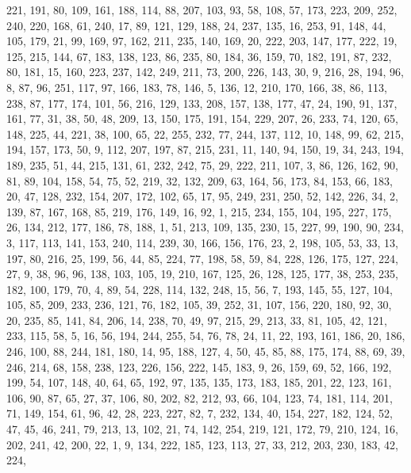 \begin{DoxyCode}
       221, 191, 80, 109, 161, 188, 114, 88, 207, 103, 93, 58, 108, 57, 173, 223, 209, 252, 240, 220, 168, 61, 240,
       17, 89, 121, 129, 188, 24, 237, 135, 16, 253, 91, 148, 44, 105, 179, 21, 99, 169, 97, 162, 211, 235, 140,
       169, 20, 222, 203, 147, 177, 222, 19, 125, 215, 144, 67, 183, 138, 123, 86, 235, 80, 184, 36, 159, 70, 182,
       191, 87, 232, 80, 181, 15, 160, 223, 237, 142, 249, 211, 73, 200, 226, 143, 30, 9, 216, 28, 194, 96, 8, 87,
       96, 251, 117, 97, 166, 183, 78, 146, 5, 136, 12, 210, 170, 166, 38, 86, 113, 238, 87, 177, 174, 101, 56, 216,
       129, 133, 208, 157, 138, 177, 47, 24, 190, 91, 137, 161, 77, 31, 38, 50, 48, 209, 13, 150, 175, 191, 154,
       229, 207, 26, 233, 74, 120, 65, 148, 225, 44, 221, 38, 100, 65, 22, 255, 232, 77, 244, 137, 112, 10, 148, 99,
       62, 215, 194, 157, 173, 50, 9, 112, 207, 197, 87, 215, 231, 11, 140, 94, 150, 19, 34, 243, 194, 189, 235,
       51, 44, 215, 131, 61, 232, 242, 75, 29, 222, 211, 107, 3, 86, 126, 162, 90, 81, 89, 104, 158, 54, 75, 52, 219,
       32, 132, 209, 63, 164, 56, 173, 84, 153, 66, 183, 20, 47, 128, 232, 154, 207, 172, 102, 65, 17, 95, 249,
       231, 250, 52, 142, 226, 34, 2, 139, 87, 167, 168, 85, 219, 176, 149, 16, 92, 1, 215, 234, 155, 104, 195, 227,
       175, 26, 134, 212, 177, 186, 78, 188, 1, 51, 213, 109, 135, 230, 15, 227, 99, 190, 90, 234, 3, 117, 113,
       141, 153, 240, 114, 239, 30, 166, 156, 176, 23, 2, 198, 105, 53, 33, 13, 197, 80, 216, 25, 199, 56, 44, 85,
       224, 77, 198, 58, 59, 84, 228, 126, 175, 127, 224, 27, 9, 38, 96, 96, 138, 103, 105, 19, 210, 167, 125, 26,
       128, 125, 177, 38, 253, 235, 182, 100, 179, 70, 4, 89, 54, 228, 114, 132, 248, 15, 56, 7, 193, 145, 55, 127,
       104, 105, 85, 209, 233, 236, 121, 76, 182, 105, 39, 252, 31, 107, 156, 220, 180, 92, 30, 20, 235, 85, 141, 84,
       206, 14, 238, 70, 49, 97, 215, 29, 213, 33, 81, 105, 42, 121, 233, 115, 58, 5, 16, 56, 194, 244, 255, 54,
       76, 78, 24, 11, 22, 193, 161, 186, 20, 186, 246, 100, 88, 244, 181, 180, 14, 95, 188, 127, 4, 50, 45, 85, 88,
       175, 174, 88, 69, 39, 246, 214, 68, 158, 238, 123, 226, 156, 222, 145, 183, 9, 26, 159, 69, 52, 166, 192,
       199, 54, 107, 148, 40, 64, 65, 192, 97, 135, 135, 173, 183, 185, 201, 22, 123, 161, 106, 90, 87, 65, 27, 37,
       106, 80, 202, 82, 212, 93, 66, 104, 123, 74, 181, 114, 201, 71, 149, 154, 61, 96, 42, 28, 223, 227, 82, 7,
       232, 134, 40, 154, 227, 182, 124, 52, 47, 45, 46, 241, 79, 213, 13, 102, 21, 74, 142, 254, 219, 121, 172, 79,
       210, 124, 16, 202, 241, 42, 200, 22, 1, 9, 134, 222, 185, 123, 113, 27, 33, 212, 203, 230, 183, 42, 224,

\end{DoxyCode}
